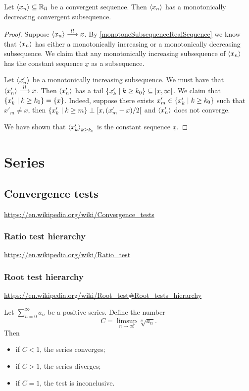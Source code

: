 \begin{lemma} \label{lowerLimitConvergenceDecreasingSubsequence}
Let $\left\langle x_n \right\rangle\subseteq \mathbb{R}_{ll}$ be a convergent sequence. Then $\left\langle x_n \right\rangle$ has a monotonically decreasing convergent subsequence.
\end{lemma}
\begin{proof}
Suppose $\left\langle x_n \right\rangle \overset{ll}{\longrightarrow} x$. By \ref{monotoneSubsequenceRealSequence} we know that $\left\langle x_n \right\rangle$ has either a monotonically increasing or a monotonically decreasing subsequence. We claim that any monotonically increasing subsequence of $\left\langle x_n \right\rangle$ has the constant sequence $\underline{x}$ as a subsequence.

Let $\left\langle x'_n \right\rangle$ be a monotonically increasing subsequence. We must have that $\left\langle x'_n \right\rangle \overset{ll}{\longrightarrow} x$. Then $\left\langle x'_n \right\rangle$ has a tail $\setbuilder{x'_k}{k \geq k_0}\subseteq \interval[co]{x,\infty}$. We claim that $\setbuilder{x'_k}{k \geq k_0} = \{x\}$. Indeed, suppose there exists $x'_m \in \setbuilder{x'_k}{k \geq k_0}$ such that $x'_m \neq x$, then $\setbuilder{x'_k}{k \geq m} \perp \interval[co]{x, (x'_m-x)/2}$ and $\left\langle x'_n \right\rangle$ does not converge.

We have shown that $\left\langle x'_k \right\rangle_{k\geq k_0}$ is the constant sequence $\underline{x}$.
\end{proof}

\section{Series}

\subsection{Convergence tests}
\url{https://en.wikipedia.org/wiki/Convergence_tests}

\subsubsection{Ratio test hierarchy}
\url{https://en.wikipedia.org/wiki/Ratio_test}
\subsubsection{Root test hierarchy}
\url{https://en.wikipedia.org/wiki/Root_test#Root_tests_hierarchy}

\begin{proposition} \label{rootTest}
Let $\sum_{n=0}^\infty a_n$ be a positive series. Define the number
\[ C = \limsup_{n\to \infty}\sqrt[n]{a_n}. \]
Then
\begin{itemize}
\item if $C<1$, the series converges;
\item if $C>1$, the series diverges;
\item if $C=1$, the test is inconclusive.
\end{itemize}
\end{proposition}

